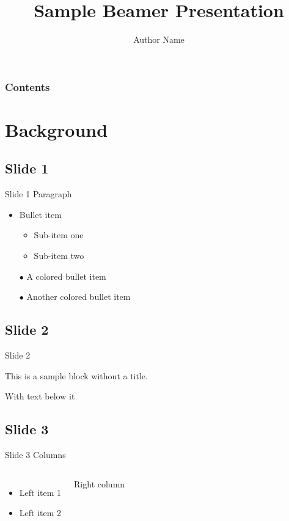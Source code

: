 \documentclass[compress,ignorenonframetext]{beamer}
\title{Sample Beamer Presentation}
\author{Author Name}
\institute{Company or Institute}
\begin{document}
\frame[plain]{\titlepage}

\begin{frame}
\addtocounter{framenumber}{-1}
\frametitle{Contents}%
\tableofcontents%
\end{frame}

\section{Background}

\subsection{Slide 1}
\begin{frame}{Slide 1}
Paragraph
\begin{itemize}
\item Bullet item
	\begin{itemize}
	\item Sub-item one
	\item Sub-item two
	\end{itemize}
\item[\color{green} $\bullet$] A colored bullet item
\item[\color{red} $\bullet$] Another colored bullet item
\end{itemize}

\end{frame}

\subsection{Slide 2}
\begin{frame}{Slide 2}
\begin{block}{}
This is a sample block without a title.
\end{block}
With text below it
\end{frame}

\subsection{Slide 3}
\begin{frame}{Slide 3}
Columns
\begin{columns}
\begin{itemize}
\item Left item 1
\item Left item 2
\end{itemize}
Right column
\end{columns}
\end{frame}
\end{document}
